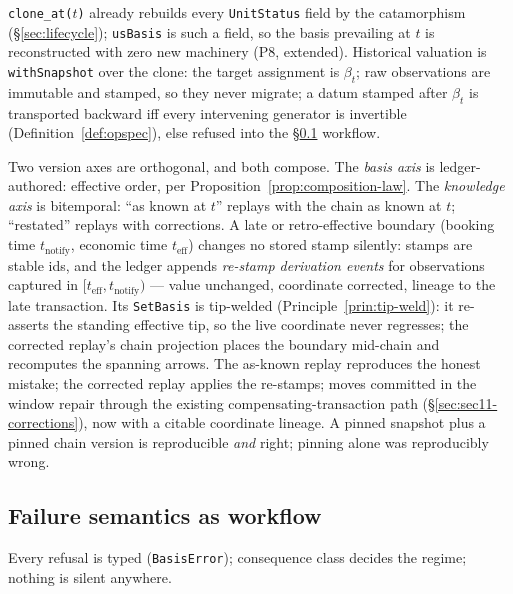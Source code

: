 \texttt{clone\_at($t$)} already rebuilds every \texttt{UnitStatus} field by the
catamorphism (\S\ref{sec:lifecycle}); \texttt{usBasis} is such a field, so the basis
prevailing at $t$ is reconstructed with zero new machinery (P8, extended). Historical
valuation is \texttt{withSnapshot} over the clone: the target assignment is $\beta_t$;
raw observations are immutable and stamped, so they never migrate; a datum stamped after
$\beta_t$ is transported backward iff every intervening generator is invertible
(Definition~\ref{def:opspec}), else refused into the \S\ref{sec:basis-failure} workflow.

Two version axes are orthogonal, and both compose. The \emph{basis axis} is
ledger-authored: effective order, per Proposition~\ref{prop:composition-law}. The
\emph{knowledge axis} is bitemporal: ``as known at $t$'' replays with the chain as known
at $t$; ``restated'' replays with corrections. A late or retro-effective boundary
(booking time $t_{\mathrm{notify}}$, economic time $t_{\mathrm{eff}}$) changes no stored
stamp silently: stamps are stable ids, and the ledger appends \emph{re-stamp derivation
events} for observations captured in $[t_{\mathrm{eff}},t_{\mathrm{notify}})$ --- value
unchanged, coordinate corrected, lineage to the late transaction. Its \texttt{SetBasis}
is tip-welded (Principle~\ref{prin:tip-weld}): it re-asserts the standing effective tip,
so the live coordinate never regresses; the corrected replay's chain projection places
the boundary mid-chain and recomputes the spanning arrows. The as-known replay
reproduces the honest mistake; the corrected replay applies the re-stamps; moves
committed in the window repair through the existing compensating-transaction path
(\S\ref{sec:sec11-corrections}), now with a citable coordinate lineage. A pinned
snapshot plus a pinned chain version is reproducible \emph{and} right; pinning alone was
reproducibly wrong.

\subsection{Failure semantics as workflow}
\label{sec:basis-failure}

Every refusal is typed (\texttt{BasisError}); consequence class decides the regime;
nothing is silent anywhere.

